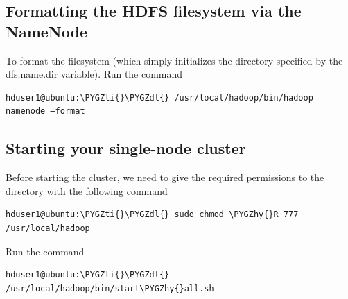 \documentclass[a4paper,12pt,oneside]{sphinxmanual}
\def\PYGZdl{\char`\$}
\def\PYGZhy{\char`\-}
\def\PYGZti{\char`\~}
\begin{document}
\subsection{Formatting the HDFS filesystem via the NameNode}
\label{document:formatting-the-hdfs-filesystem-via-the-namenode}
To format the filesystem (which simply initializes the directory specified by the dfs.name.dir variable).
Run the command

\begin{Verbatim}[commandchars=\\\{\}]
hduser1@ubuntu:\PYGZti{}\PYGZdl{} /usr/local/hadoop/bin/hadoop namenode –format
\end{Verbatim}
\begin{figure}[htbp]
\centering

\end{figure}


\subsection{Starting your single-node cluster}
\label{document:starting-your-single-node-cluster}
Before starting the cluster, we need to give the required permissions to the directory with the following command

\begin{Verbatim}[commandchars=\\\{\}]
hduser1@ubuntu:\PYGZti{}\PYGZdl{} sudo chmod \PYGZhy{}R 777 /usr/local/hadoop
\end{Verbatim}

Run the command

\begin{Verbatim}[commandchars=\\\{\}]
hduser1@ubuntu:\PYGZti{}\PYGZdl{} /usr/local/hadoop/bin/start\PYGZhy{}all.sh
\end{Verbatim}
\end{document}
